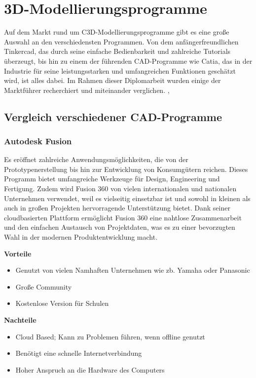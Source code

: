 \cite{Fräsen-3/4/5-Achs}


\section{3D-Modellierungsprogramme}
Auf dem Markt rund um C3D-Modellierungsprogramme gibt es eine große Auswahl an den verschiedensten Programmen. Von dem anfängerfreundlichen Tinkercad, das durch seine einfache Bedienbarkeit und zahlreiche Tutorials überzeugt, bis hin zu einem der führenden CAD-Programme wie Catia, das in der Industrie für seine leistungsstarken und umfangreichen Funktionen geschätzt wird, ist alles dabei. Im Rahmen dieser Diplomarbeit wurden einige der Marktführer recherchiert und miteinander verglichen.
\cite{CAD-Programme}, \cite{3D-Printing-Software}

\subsection{Vergleich verschiedener CAD-Programme}

\subsubsection{Autodesk Fusion}
Es eröffnet zahlreiche Anwendungsmöglichkeiten, die von der Prototypenerstellung bis hin zur Entwicklung von Konsumgütern reichen. Dieses Programm bietet umfangreiche Werkzeuge für Design, Engineering und Fertigung. Zudem wird Fusion 360 von vielen internationalen und nationalen Unternehmen verwendet, weil es vielseitig einsetzbar ist und sowohl in kleinen als auch in großen Projekten hervorragende Unterstützung bietet. Dank seiner cloudbasierten Plattform ermöglicht Fusion 360 eine nahtlose Zusammenarbeit und den einfachen Austausch von Projektdaten, was es zu einer bevorzugten Wahl in der modernen Produktentwicklung macht. 
\cite{AutodeskFusion}

\textbf{Vorteile}
\begin{itemize}
	\item Genutzt von vielen Namhaften Unternehmen wie zb. Yamaha oder Panasonic
	\item Große Community
	\item Kostenlose Version für Schulen
\end{itemize} 

\textbf{Nachteile}
\begin{itemize}
	\item Cloud Based; Kann zu Problemen führen, wenn offline genutzt 
	\item Benötigt eine schnelle Internetverbindung
	\item Hoher Anspruch an die Hardware des Computers
\end{itemize}
\cite{AutodeskFusionReviews}


